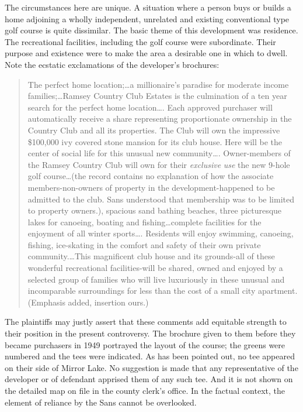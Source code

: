 The circumstances here are unique. A situation where a person buys or builds a
home adjoining a wholly independent, unrelated and existing conventional type
golf course is quite dissimilar. The basic theme of this development was
residence. The recreational facilities, including the golf course were
subordinate. Their purpose and existence were to make the area a desirable one
in which to dwell. Note the ecstatic exclamations of the developer's brochures:
\begin{quote}
The perfect home location;\ldots a millionaire's paradise for moderate income
families;\ldots Ramsey Country Club Estates is the culmination of a ten year
search for the perfect home location\ldots. Each approved purchaser will
automatically receive a share representing proportionate ownership in the
Country Club and all its properties. The Club will own the impressive \$100,000
ivy covered stone mansion for its club house. Here will be the center of social
life for this unusual new community\ldots. Owner-members of the Ramsey Country
Club will own for their \textit{exclusive} \textit{use} the new 9-hole golf
course\ldots (the record contains no explanation of how the associate
members-non-owners of property in the development-happened to be admitted to the
club. Sans understood that membership was to be limited to property owners.),
spacious sand bathing beaches, three picturesque lakes for canoeing, boating and
fishing\ldots complete facilities for the enjoyment of all winter sports\ldots.
Residents will enjoy swimming, canoeing, fishing, ice-skating in the comfort and
safety of their own private community.\ldots This magnificent club house and its
grounds-all of these wonderful recreational facilities-will be shared, owned and
enjoyed by a selected group of families who will live luxuriously in these
unusual and incomparable surroundings for less than the cost of a small city
apartment. (Emphasis added, insertion ours.)
\end{quote}

The plaintiffs may justly assert that these comments add equitable strength to
their position in the present controversy. The brochure given to them before
they became purchasers in 1949 portrayed the layout of the course; the greens
were numbered and the tees were indicated. As has been pointed out, no tee
appeared on their side of Mirror Lake. No suggestion is made that any
representative of the developer or of defendant apprised them of any such tee.
And it is not shown on the detailed map on file in the county clerk's office. In
the factual context, the element of reliance by the Sans cannot be overlooked.

